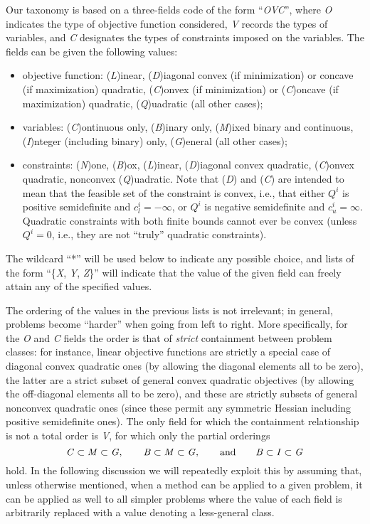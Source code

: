Our taxonomy is based on a three-fields code of the form ``\textit{OVC}'', where \textit{O} indicates the type of objective function considered, \textit{V} records the types of variables, and \textit{C} designates the types of constraints imposed on the variables. The fields can be given the following values:
%
\begin{itemize}
 \item objective function: (\textit{L})inear, (\textit{D})iagonal convex (if minimization) or concave (if maximization) quadratic, (\textit{C})onvex (if minimization) or (\textit{C})oncave (if maximization) quadratic,  (\textit{Q})uadratic (all other cases);
 \item variables: (\textit{C})ontinuous only, (\textit{B})inary only, (\textit{M})ixed binary and continuous, (\textit{I})nteger (including binary) only, (\textit{G})eneral (all other cases);
 \item constraints: (\textit{N})one, (\textit{B})ox, (\textit{L})inear, (\textit{D})iagonal convex quadratic, (\textit{C})on\-vex quadratic, nonconvex (\textit{Q})uadratic.
  Note that (\textit{D}) and (\textit{C}) are intended to mean that the feasible set of the constraint is convex, i.e., that either $Q^i$ is positive semidefinite and $c_l^i = -\infty$, or $Q^i$ is negative semidefinite and $c_u^i = \infty$. Quadratic constraints with both finite bounds cannot ever be convex (unless $Q^i = 0$, i.e., they are not ``truly'' quadratic constraints).
\end{itemize}
%
The wildcard ``*'' will be used below to indicate any possible choice, and lists of the form ``\{\textit{X}, \textit{Y}, \textit{Z}\}'' will indicate that the value of the given field can freely attain any of the specified values.

The ordering of the values in the previous lists is not irrelevant; in general, problems become ``harder'' when going from left to right. More specifically, for the \textit{O} and \textit{C} fields the order is that of \emph{strict} containment between problem classes: for instance, linear objective functions are strictly a special case of diagonal convex quadratic ones (by allowing the diagonal elements all to be zero), the latter are a strict subset of general convex quadratic objectives (by allowing the off-diagonal elements all to be zero), and these are strictly subsets of general nonconvex quadratic ones (since these permit any symmetric Hessian including positive semidefinite ones). The only field for which the containment relationship is not a total order is \textit{V}, for which only the partial orderings
\[
 \mbox{\textit{C}} \subset \mbox{\textit{M}} \subset \mbox{\textit{G}},
 \qquad
 \mbox{\textit{B}} \subset \mbox{\textit{M}} \subset \mbox{\textit{G}},
 \qquad
 \mbox{and}
 \qquad
 \mbox{\textit{B}} \subset \mbox{\textit{I}} \subset \mbox{\textit{G}}
\]
hold. In the following discussion we will repeatedly exploit this by assuming that, unless otherwise mentioned, when a method can be applied to a given problem, it can be applied as well to all simpler problems where the value of each field is arbitrarily replaced with a value denoting a less-general class.


